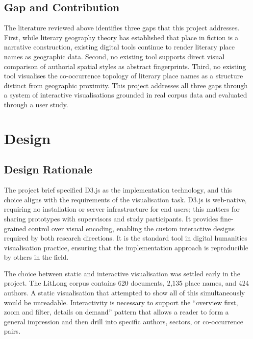 \documentclass[logo,msc]{infthesis}
\begin{document}
\section{Gap and Contribution}
 
The literature reviewed above identifies three gaps that this project addresses. First, while literary geography theory has established that place in fiction is a narrative construction, existing digital tools continue to render literary place names as geographic data. Second, no existing tool supports direct visual comparison of authorial spatial styles as abstract fingerprints. Third, no existing tool visualises the co-occurrence topology of literary place names as a structure distinct from geographic proximity. This project addresses all three gaps through a system of interactive visualisations grounded in real corpus data and evaluated through a user study.
 
 
\chapter{Design}
\label{chap:design}
 
\section{Design Rationale}
 
The project brief specified D3.js as the implementation technology, and this choice aligns with the requirements of the visualisation task. D3.js is web-native, requiring no installation or server infrastructure for end users; this matters for sharing prototypes with supervisors and study participants. It provides fine-grained control over visual encoding, enabling the custom interactive designs required by both research directions. It is the standard tool in digital humanities visualisation practice, ensuring that the implementation approach is reproducible by others in the field.
 
The choice between static and interactive visualisation was settled early in the project. The LitLong corpus contains 620 documents, 2,135 place names, and 424 authors. A static visualisation that attempted to show all of this simultaneously would be unreadable. Interactivity is necessary to support the ``overview first, zoom and filter, details on demand'' pattern \cite{shneiderman1996} that allows a reader to form a general impression and then drill into specific authors, sectors, or co-occurrence pairs.
 
\end{document}
